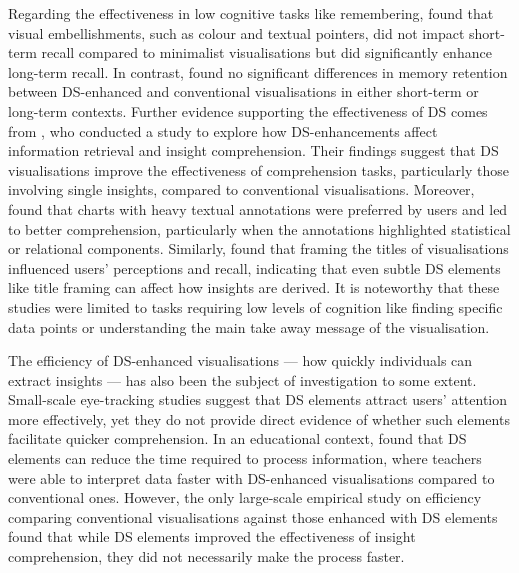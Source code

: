 Regarding the effectiveness in low cognitive tasks like remembering, \citet{bateman2010} found that visual embellishments, such as colour and textual pointers, did not impact short-term recall compared to minimalist visualisations but did significantly enhance long-term recall. In contrast, \citet{zdanovic2022influence} found no significant differences in memory retention between DS-enhanced and conventional visualisations in either short-term or long-term contexts. Further evidence supporting the effectiveness of DS comes from \citet{shao2024datastorytelling}, who conducted a study to explore how DS-enhancements affect information retrieval and insight comprehension. Their findings suggest that DS visualisations improve the effectiveness of comprehension tasks, particularly those involving single insights, compared to conventional visualisations. Moreover, \citet{stokes2023striking} found that charts with heavy textual annotations were preferred by users and led to better comprehension, particularly when the annotations highlighted statistical or relational components. Similarly, \citet{kong2018} found that framing the titles of visualisations influenced users' perceptions and recall, indicating that even subtle DS elements like title framing can affect how insights are derived. It is noteworthy that these studies were limited to tasks requiring low levels of cognition like finding specific data points or understanding the main take away message of the visualisation. 

The efficiency of DS-enhanced visualisations — how quickly individuals can extract insights — has also been the subject of investigation to some extent. Small-scale eye-tracking studies \cite{de2014evaluating,Pozdniakov2023how} suggest that DS elements attract users' attention more effectively, yet they do not provide direct evidence of whether such elements facilitate quicker comprehension. In an educational context, \citet{echeverria2018exploratory} found that DS elements can reduce the time required to process information, where teachers were able to interpret data faster with DS-enhanced visualisations compared to conventional ones. However, the only large-scale empirical study on efficiency comparing conventional visualisations against those enhanced with DS elements \cite{shao2024datastorytelling} found that while DS elements improved the effectiveness of insight comprehension, they did not necessarily make the process faster.


